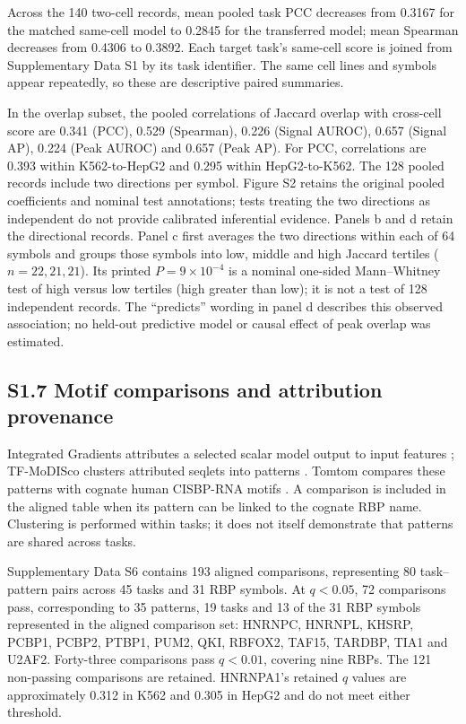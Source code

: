\documentclass[11pt]{article}
\begin{document}
Across the 140 two-cell records, mean pooled task PCC decreases from 0.3167 for the matched same-cell model to 0.2845 for the transferred model; mean Spearman decreases from 0.4306 to 0.3892. Each target task's same-cell score is joined from Supplementary Data S1 by its task identifier. The same cell lines and symbols appear repeatedly, so these are descriptive paired summaries.

In the overlap subset, the pooled correlations of Jaccard overlap with cross-cell score are 0.341 (PCC), 0.529 (Spearman), 0.226 (Signal AUROC), 0.657 (Signal AP), 0.224 (Peak AUROC) and 0.657 (Peak AP). For PCC, correlations are 0.393 within K562-to-HepG2 and 0.295 within HepG2-to-K562. The 128 pooled records include two directions per symbol. Figure S2 retains the original pooled coefficients and nominal test annotations; tests treating the two directions as independent do not provide calibrated inferential evidence. Panels b and d retain the directional records. Panel c first averages the two directions within each of 64 symbols and groups those symbols into low, middle and high Jaccard tertiles ($n=22,21,21$). Its printed $P=9\times10^{-4}$ is a nominal one-sided Mann--Whitney test of high versus low tertiles (high greater than low); it is not a test of 128 independent records. The ``predicts'' wording in panel d describes this observed association; no held-out predictive model or causal effect of peak overlap was estimated.

\subsection*{S1.7 Motif comparisons and attribution provenance}

Integrated Gradients attributes a selected scalar model output to input features \citep{sundararajan2017integrated}; TF-MoDISco clusters attributed seqlets into patterns \citep{shrikumar2018tfmodisco}. Tomtom compares these patterns with cognate human CISBP-RNA motifs \citep{ray2013compendium,gupta2007tomtom}. A comparison is included in the aligned table when its pattern can be linked to the cognate RBP name. Clustering is performed within tasks; it does not itself demonstrate that patterns are shared across tasks.

Supplementary Data S6 contains 193 aligned comparisons, representing 80 task--pattern pairs across 45 tasks and 31 RBP symbols. At $q<0.05$, 72 comparisons pass, corresponding to 35 patterns, 19 tasks and 13 of the 31 RBP symbols represented in the aligned comparison set: HNRNPC, HNRNPL, KHSRP, PCBP1, PCBP2, PTBP1, PUM2, QKI, RBFOX2, TAF15, TARDBP, TIA1 and U2AF2. Forty-three comparisons pass $q<0.01$, covering nine RBPs. The 121 non-passing comparisons are retained. HNRNPA1's retained $q$ values are approximately 0.312 in K562 and 0.305 in HepG2 and do not meet either threshold.
\end{document}
